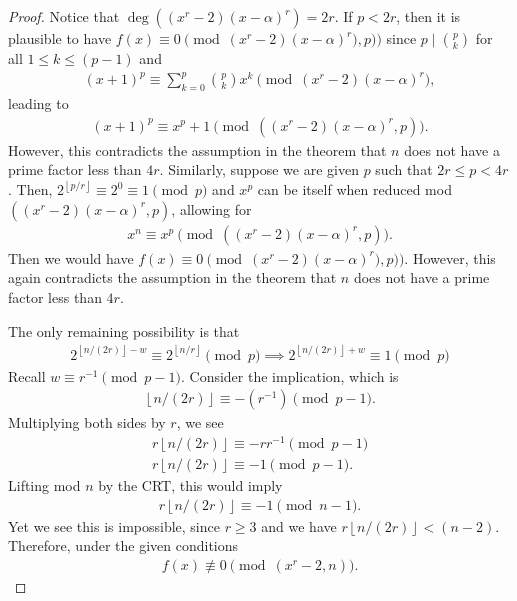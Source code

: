 \documentclass{article}
\theoremstyle{plain}
\theoremstyle{definition}
\newcommand{\floor}[1]{\left\lfloor #1 \right\rfloor}
\begin{document}
\begin{proof}
Notice that $\deg((x^r-2)(x-\alpha)^r) = 2r$. If $p < 2r$, then it is plausible to have $f(x) \equiv 0 \pmod{(x^r-2)(x-\alpha)^r),p)}$ since $p \mid \binom{p}{k}$ for all $1 \leq k \leq (p-1)$ and
\begin{align*}
(x+1)^p \equiv \sum_{k=0}^p \binom{p}{k} x^k \pmod{(x^r-2)(x-\alpha)^r} ,
\end{align*}
leading to
\begin{align*}
(x+1)^p \equiv x^p + 1 \pmod{((x^r-2)(x-\alpha)^r,p)} .
\end{align*}
However, this contradicts the assumption in the theorem that $n$ does not have a prime factor less than $4r$. Similarly, suppose we are given $p$ such that $2r \leq p < 4r$. Then, $2^{\floor{p/r}} \equiv 2^0 \equiv 1 \pmod{p}$ and $x^p$ can be itself when reduced mod $((x^r-2)(x-\alpha)^r,p)$, allowing for
\begin{align*}
x^n \equiv x^p \pmod{((x^r-2)(x-\alpha)^r,p)} .
\end{align*}
Then we would have $f(x) \equiv 0 \pmod{(x^r-2)(x-\alpha)^r),p)}$. However, this again contradicts the assumption in the theorem that $n$ does not have a prime factor less than $4r$.

The only remaining possibility is that
\begin{align*}
    2^{\floor{n/(2r)} - w} \equiv 2^{\floor{n/r}} \pmod{p}
    \implies 2^{\floor{n/(2r)} + w} \equiv 1 \pmod{p}
\end{align*}
Recall $w \equiv r^{-1} \pmod{p-1}$. Consider the implication, which is
\begin{align*}
    \floor{n/(2r)} \equiv -(r^{-1}) \pmod{p-1} .
\end{align*}
Multiplying both sides by $r$, we see
\begin{align*}
    r \floor{n/(2r)}  \equiv -r r^{-1} \pmod{p-1} \\
    r \floor{n/(2r)} \equiv -1 \pmod{p-1} .
\end{align*}
Lifting mod $n$ by the CRT, this would imply
\begin{align*}
    r \floor{n/(2r)} \equiv -1 \pmod{n-1} .
\end{align*}
Yet we see this is impossible, since $r \geq 3$ and we have $r \floor{n/(2r)} < (n-2)$. Therefore, under the given conditions
\begin{align*}
 f(x) \not\equiv 0 \pmod{(x^r-2, n)} .
\end{align*}
\end{proof}
\end{document}
